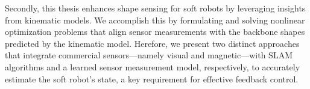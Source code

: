 Secondly, this thesis enhances shape sensing for soft robots by leveraging insights from kinematic models. We accomplish this by formulating and solving nonlinear optimization problems that align sensor measurements with the backbone shapes predicted by the kinematic model. Herefore, we present two distinct approaches that integrate commercial sensors—namely visual and magnetic—with SLAM algorithms and a learned sensor measurement model, respectively, to accurately estimate the soft robot’s state, a key requirement for effective feedback control.

